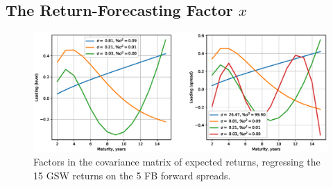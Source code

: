 \subsection{The Return-Forecasting Factor $x$}

\begin{figure}[h!]
	\centering
	\caption{Factors in the covariance matrix of expected returns, regressing the 15 GSW returns on the 5 FB forward spreads.}\label{fig:3}
	\includegraphics[scale=0.5]{fig/eps/Figure3.eps}
\end{figure}


